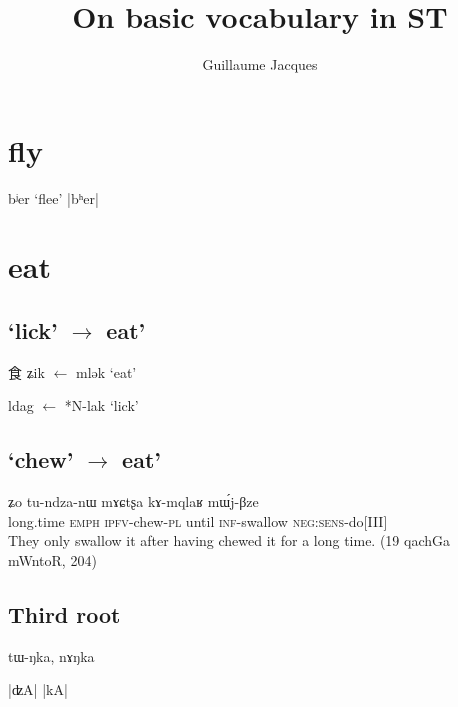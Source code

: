 \documentclass[oldfontcommands,oneside,a4paper,11pt]{article}
\newcommand{\ipa}[1]{{\phon #1}} %
\newcommand{\khyal}[1]{\ipa{|#1|}}
\newcommand{\zh}[1]{{\cn #1}}
\newcommand{\ch}[4]{\zh{#1} \ipa{#2} $\leftarrow$ \ipa{*#3} `#4'}
\begin{document}
 
 \title{On basic vocabulary in ST}
 \author{Guillaume Jacques}
 \maketitle  
 
  \section{fly}
  
  \ipa{bʲer} `flee' \khyal{bʰer}
  
 

 \section{eat}
 
 
 \subsection{`lick' $\rightarrow$  eat'}
\ch{食}{ʑik}{mlək}{eat}

\ipa{ldag} $\leftarrow$ *\ipa{N-lak} `lick'
 \subsection{`chew' $\rightarrow$  eat'}
 
 \begin{exe}
\ex 
\gll \ipa{ʑɯmkhɤm}  	\ipa{ʑo}  	\ipa{tu-ndza-nɯ}  	\ipa{mɤɕtʂa}  	\ipa{kɤ-mqlaʁ}  	\ipa{mɯ́j-βze}   \\
long.time \textsc{emph} \textsc{ipfv}-chew-\textsc{pl} until \textsc{inf}-swallow \textsc{neg:sens}-do[III] \\
\glt They only swallow it after having chewed it for a long time. (19 qachGa mWntoR, 204)
\end{exe}

 \subsection{Third root}
 
 \ipa{tɯ-ŋka}, \ipa{nɤŋka}

\khyal{ʣA} 
 \khyal{kA}
 


\end{document}
